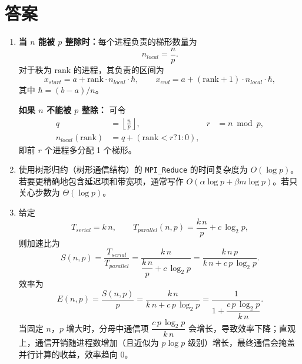 \section{答案}
\begin{enumerate}
    \item \textbf{当 $n$ 能被 $p$ 整除时：}每个进程负责的梯形数量为
    $$n_{local} = \frac{n}{p}.$$ 对于秩为 $\text{rank}$ 的进程，其负责的区间为
    $$x_{start} = a + \text{rank} \cdot n_{local} \cdot \hbar,\qquad x_{end} = a + (\text{rank}+1) \cdot n_{local} \cdot \hbar,$$
    其中 $\hbar=(b-a)/n$。
    
    \textbf{如果 $n$ 不能被 $p$ 整除：}
    可令\begin{align*}
        q &= \left\lfloor\frac{n}{p}\right\rfloor, & r &= n \bmod p, \\
        n_{local}(\text{rank}) &= q + (\text{rank}<r?1:0),
    \end{align*}
    即前 $r$ 个进程多分配 1 个梯形。

    \item 使用树形归约（树形通信结构）的 \texttt{MPI\_Reduce} 的时间复杂度为 $O(\log p)$。若要更精确地包含延迟项和带宽项，通常写作 $O(\alpha\log p + \beta m\log p)$。若只关心步数为 $\Theta(\log p)$。

    \item 给定
    $$T_{serial}=k\,n,\qquad T_{parallel}(n,p)=\frac{k\,n}{p}+c\,\log_2 p,$$
    则加速比为
    $$S(n,p)=\frac{T_{serial}}{T_{parallel}}=\frac{k\,n}{\dfrac{k\,n}{p}+c\,\log_2 p}=\frac{k\,n\,p}{k\,n+c\,p\,\log_2 p}.$$  效率为
    $$E(n,p)=\frac{S(n,p)}{p}=\frac{k\,n}{k\,n+c\,p\,\log_2 p}=\frac{1}{1+\dfrac{c\,p\,\log_2 p}{k\,n}}.$$
    当固定 $n$，$p$ 增大时，分母中通信项 $\dfrac{c\,p\,\log_2 p}{k\,n}$ 会增长，导致效率下降；直观上，通信开销随进程数增加（且近似为 $p\log p$ 级别）增长，最终通信会掩盖并行计算的收益，效率趋向 0。
\end{enumerate}